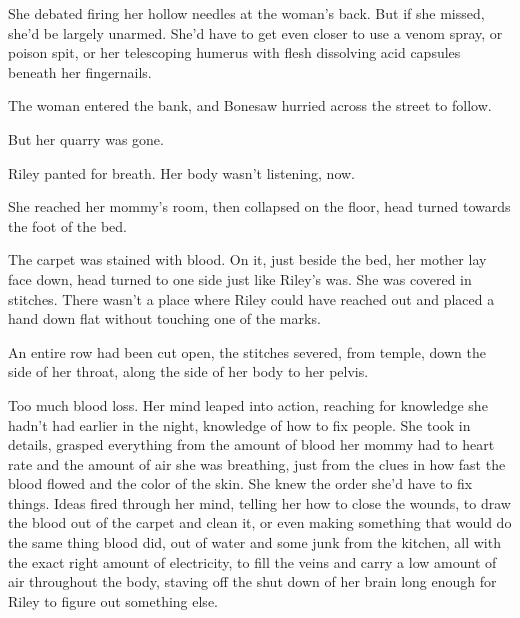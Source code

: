 She debated firing her hollow needles at the woman's back.  But if she missed, she'd be largely unarmed.  She'd have to get even closer to use a venom spray, or poison spit, or her telescoping humerus with flesh dissolving acid capsules beneath her fingernails.



The woman entered the bank, and Bonesaw hurried across the street to follow.



But her quarry was gone.



\sectionbreak






Riley panted for breath.  Her body wasn't listening, now.



She reached her mommy's room, then collapsed on the floor, head turned towards the foot of the bed.



The carpet was stained with blood.  On it, just beside the bed, her mother lay face down, head turned to one side just like Riley's was.  She was covered in stitches.  There wasn't a place where Riley could have reached out and placed a hand down flat without touching one of the marks.



An entire row had been cut open, the stitches severed, from temple, down the side of her throat, along the side of her body to her pelvis.



Too much blood loss.  Her mind leaped into action, reaching for knowledge she hadn't had earlier in the night, knowledge of how to fix people.  She took in details, grasped everything from the amount of blood her mommy had to heart rate and the amount of air she was breathing, just from the clues in how fast the blood flowed and the color of the skin.  She knew the order she'd have to fix things.  Ideas fired through her mind, telling her how to close the wounds, to draw the blood out of the carpet and clean it, or even making something that would do the same thing blood did, out of water and some junk from the kitchen, all with the exact right amount of electricity, to fill the veins and carry a low amount of air throughout the body, staving off the shut down of her brain long enough for Riley to figure out something else.



